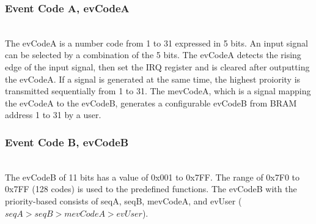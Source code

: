 \documentclass[journal,reqno]{IEEEtran}
\begin{document}
\subsubsection{Event Code A, evCodeA}\hspace*{\fill} \\
The evCodeA is a number code from 1 to 31 expressed in 5 bits. An input signal can be selected by a combination of the 5 bits. The evCodeA detects the rising edge of the input signal, then set the IRQ register and is cleared after outputting the evCodeA. If a signal is generated at the same time, the highest proiority is transmitted sequentially from 1 to 31. The mevCodeA, which is a signal mapping the evCodeA to the evCodeB, generates a configurable evCodeB from BRAM address 1 to 31 by a user.\newline

\subsubsection{Event Code B, evCodeB}\hspace*{\fill} \\
The evCodeB of 11 bits has a value of 0x001 to 0x7FF. The range of 0x7F0 to 0x7FF (128 codes) is used to the predefined functions. The evCodeB with the priority-based consists of seqA, seqB, mevCodeA, and evUser ($seqA > seqB > mevCodeA > evUser$). \newline
\end{document}

